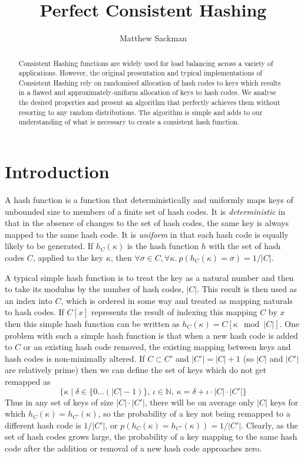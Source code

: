 \documentclass[runningheads,a4paper]{llncs}
\begin{document}
\mainmatter

\title{Perfect Consistent Hashing}

\author{Matthew Sackman\\}
\institute{}
\maketitle

\begin{abstract}
Consistent Hashing functions are widely used for load balancing across
a variety of applications. However, the original presentation and
typical implementations of Consistent Hashing rely on randomised
allocation of hash codes to keys which results in a flawed and
approximately-uniform allocation of keys to hash codes. We analyse the
desired properties and present an algorithm that perfectly achieves
them without resorting to any random distributions. The algorithm is
simple and adds to our understanding of what is necessary to create a
consistent hash function.
\end{abstract}


\section{Introduction}

A hash function is a function that deterministically and uniformly
maps keys of unbounded size to members of a finite set of hash
codes. It is {\em deterministic} in that in the absence of changes to
the set of hash codes, the same key is always mapped to the same hash
code. It is {\em uniform} in that each hash code is equally likely to
be generated. If $h_C(\kappa)$ is the hash function $h$ with the set
of hash codes $C$, applied to the key $\kappa$, then $\forall \sigma
\in C, \forall \kappa.\: p(h_C(\kappa) = \sigma) = 1/|C|$.

A typical simple hash function is to treat the key as a natural number
and then to take its modulus by the number of hash codes, $|C|$. This
result is then used as an index into $C$, which is ordered in some way
and treated as mapping naturals to hash codes. If $C[x]$ represents
the result of indexing this mapping $C$ by $x$ then this simple hash
function can be written as $h_C(\kappa) = C[\kappa \mod |C|]$. One
problem with such a simple hash function is that when a new hash code
is added to $C$ or an existing hash code removed, the existing mapping
between keys and hash codes is non-minimally altered. If $C \subset
C'$ and $|C'| = |C| + 1$ (so $|C|$ and $|C'|$ are relatively prime)
then we can define the set of keys which do not get remapped as
\[ \{\kappa \mid \delta \in \{0 \dots (|C| - 1)\},\, \iota \in
\mathbb{N},\, \kappa = \delta + \iota \cdot |C| \cdot |C'|\} \] Thus
in any set of keys of size $|C| \cdot |C'|$, there will be on average
only $|C|$ keys for which $h_C(\kappa) = h_{C'}(\kappa)$, so the
probability of a key not being remapped to a different hash code is
$1/|C'|$, or $p(h_C(\kappa) = h_{C'}(\kappa)) = 1/|C'|$. Clearly, as
the set of hash codes grows large, the probability of a key mapping to
the same hash code after the addition or removal of a new hash code
approaches zero.
\end{document}

